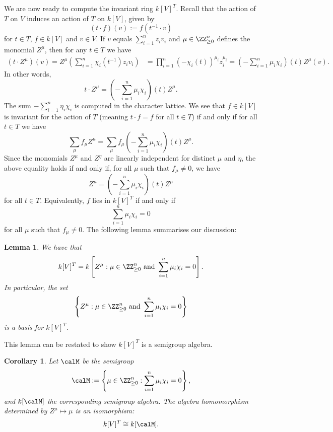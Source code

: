 \documentclass[12pt]{amsart}
\theoremstyle{plain}
\newtheorem{corollary}[theorem]{Corollary}
\newtheorem{lemma}[theorem]{Lemma}
\begin{document}
We are now ready to compute the invariant ring $k[V]^T$.
Recall that the action of $T$ on $V$ induces an action of $T$ on $k[V]$, given by
$$(t \cdot f)(v) := f(t^{-1} \cdot v)$$
for $t \in T$, $f \in k[V]$ and $v \in V$.
If $v$ equals $\sum_{i=1}^n z_i v_i$ and $\mu \in \ZZ_{\ge 0}^n$ defines the monomial $Z^\mu$, then for any $t \in T$ we have
\begin{align*}
	(t \cdot Z^\mu)(v) = Z^\mu \left( \sum_{i=1}^n \chi_i(t^{-1}) z_i v_i\right) 
	&= \prod_{i=1}^n \left(- \chi_i(t)\right)^{\mu_i} z_i^{\mu_i} %
	= \left(-\sum_{i=1}^n \mu_i \chi_i \right)(t) Z^\mu(v).
\end{align*}
In other words,
$$t \cdot Z^\mu = \left(-\sum_{i=1}^n \mu_i \chi_i \right)(t) Z^\mu.$$
The sum $-\sum_{i=1}^n \eta_i \chi_i$ is computed in the character lattice.
We see that $f \in k[V]$ is invariant for the action of $T$ (meaning $t\cdot f =f$ for all $t \in T$) if and only if for all $t \in T$ we have
$$\sum_\mu f_\mu Z^\mu = \sum_\mu f_\mu \left(-\sum_{i=1}^n \mu_i \chi_i \right)(t) Z^\mu.$$
Since the monomials $Z^\mu$ and $Z^\eta$ are linearly independent for distinct $\mu$ and $\eta$, the above equality holds if and only if, for all $\mu$ such that $f_\mu \ne 0$, we have
$$Z^\mu = \left(-\sum_{i=1}^n \mu_i \chi_i \right)(t) Z^\mu$$
for all $t \in T$.
Equivalently, $f$ lies in $k[V]^T$ if and only if 
$$\sum_{i=1}^n \mu_i \chi_i = 0$$
for all $\mu$ such that $f_\mu \ne 0$.
The following lemma summarises our discussion:

\begin{lemma}\label{lemma:invariantring}
We have that
$$k[V]^T = k \left[Z^\mu : \mu \in \ZZ_{\ge 0}^n \text{ and } \sum_{i=1}^n \mu_i \chi_i = 0 \right].$$
In particular, the set
$$\left\{Z^\mu : \mu \in \ZZ_{\ge 0}^n \text{ and } \sum_{i=1}^n \mu_i \chi_i = 0 \right\}$$
is a basis for $k[V]^T$.
\end{lemma}

This lemma can be restated to show $k[V]^T$ is a semigroup algebra.

\begin{corollary}\label{lemma:invariantringcorollary}
Let $\calM$ be the semigroup
$$\calM := \left\{\mu \in \ZZ_{\ge 0}^n : \sum_{i=1}^n \mu_i \chi_i = 0 \right\},$$
and $k[\calM]$ the corresponding semigroup algebra.
The algebra homomorphism determined by $Z^\mu \mapsto \mu$ is an isomorphism:
$$k[V]^T \cong k[\calM].$$
\end{corollary}
\end{document}
